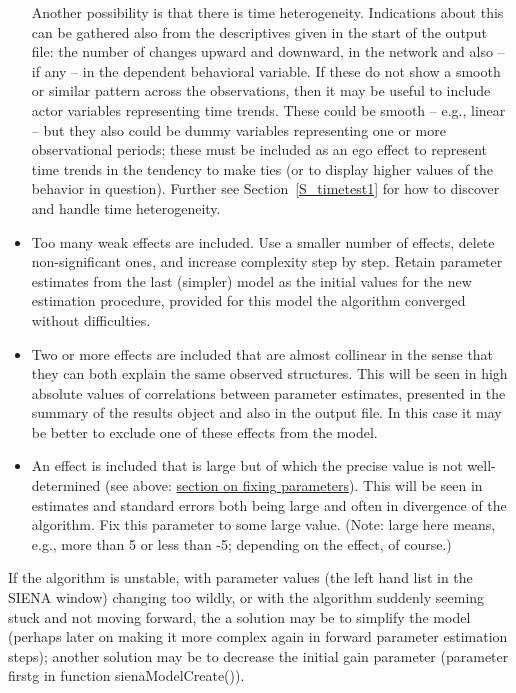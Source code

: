 \documentclass[a4paper,fleqn,11pt]{article}
\newcommand{\+}{\, + \,}
\newcommand{\sfn}[1]{\textsf{#1}}
\newcommand{\SI}{{\sf SIENA }}
\begin{document}
\begin{itemize}
      Another possibility is that there is time heterogeneity.
      Indications about this can be gathered also from the descriptives
      given in the start of the output file: the number of changes
      upward and downward, in the network and also -- if any -- in the
      dependent behavioral variable. If these do not show a smooth
      or similar pattern across the observations, then it may be useful
      to include actor variables representing time trends. These
      could be smooth -- e.g., linear -- but they also could be dummy variables
      representing one or more observational periods; these must be included
      as an ego effect to represent time trends in the tendency to make ties
      (or to display higher values of the behavior in question).
      Further see Section~\ref{S_timetest1} for how to discover and handle
      time heterogeneity.
\item Too many weak effects are included. Use a smaller number of effects,
      delete non-significant ones, and increase complexity step by step.
      Retain parameter estimates from the last
      (simpler) model as the initial values for the new estimation procedure,
      provided for this model the algorithm converged
      without difficulties.
\item Two or more effects are included that are almost collinear
      in the sense that they can both explain the same observed structures.
      This will be seen in high absolute values of
      correlations between parameter estimates, presented in the
      \sfn{summary} of the results object and also in the output file.
      In this case it may be better to exclude one of these effects from the model.
\item An effect is included that is large but of which the precise
      value is not well-determined (see above:
      \hyperlink{T_fix}{section on fixing parameters}).
      This will be seen in estimates and standard errors both being large
      and often in divergence of the algorithm.
      Fix this parameter to some large value.
      (Note: large here means, e.g., more than 5 or less than -5; depending
      on the effect, of course.)
\end{itemize}

If the algorithm is unstable, with parameter values (the left hand list
in the \SI window) changing too wildly, or with the algorithm
suddenly seeming stuck and not moving forward, the a solution may be
to simplify the model (perhaps later on making it more complex again
in forward parameter estimation steps); another solution may be
to decrease the initial gain parameter (parameter \textsf{firstg}
in function \textsf{sienaModelCreate()}).
\end{document}
